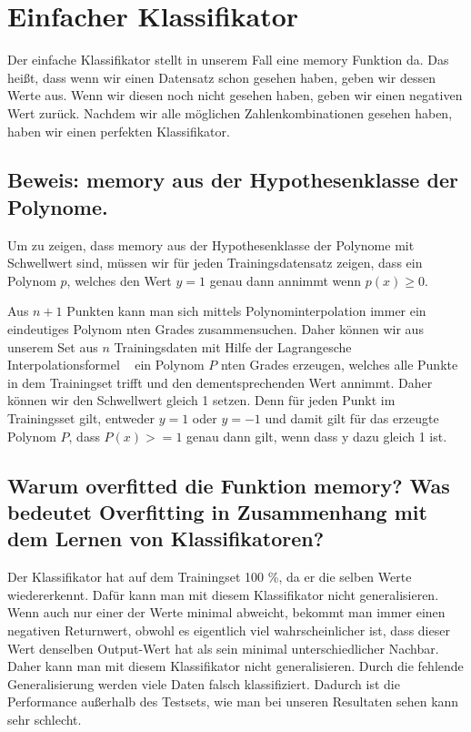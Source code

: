 \section{Einfacher Klassifikator}
\label{ch:implementation}

Der einfache Klassifikator stellt in unserem Fall eine memory Funktion da. Das heißt, dass wenn wir einen Datensatz schon gesehen haben, geben wir dessen Werte aus. Wenn wir diesen noch nicht gesehen haben, geben wir einen negativen Wert zurück. Nachdem wir alle möglichen Zahlenkombinationen gesehen haben, haben wir einen perfekten Klassifikator. 

\subsection{Beweis: memory aus der Hypothesenklasse der Polynome.}

Um zu zeigen, dass memory aus der Hypothesenklasse der Polynome mit Schwellwert sind, müssen wir für jeden Trainingsdatensatz zeigen, dass ein Polynom $p$, welches den Wert $y = 1$ genau dann annimmt wenn $p(x) \ge 0$. 

Aus $n + 1$ Punkten kann man sich mittels Polynominterpolation immer ein eindeutiges Polynom nten Grades zusammensuchen. Daher können wir aus unserem Set aus $n$ Trainingsdaten mit Hilfe der Lagrangesche Interpolationsformel ~\cite{norlund2013vorlesungen} ein Polynom $P$ nten Grades erzeugen, welches alle Punkte in dem Trainingset trifft und den dementsprechenden Wert annimmt. Daher können wir den Schwellwert gleich 1 setzen. Denn für jeden Punkt im Trainingsset gilt, entweder $y = 1$ oder $y = -1$ und damit gilt für das erzeugte Polynom $P$, dass $P(x) >= 1$ genau dann gilt, wenn dass y dazu gleich 1 ist.



\subsection{Warum overfitted die Funktion memory? Was bedeutet Overfitting in Zusammenhang mit dem Lernen von Klassifikatoren?} 

Der Klassifikator hat auf dem Trainingset 100 \%, da er die selben Werte wiedererkennt. Dafür kann man mit diesem Klassifikator nicht generalisieren. Wenn auch nur einer der Werte minimal abweicht, bekommt man immer einen negativen Returnwert, obwohl es eigentlich viel wahrscheinlicher ist, dass dieser Wert denselben Output-Wert hat als sein minimal unterschiedlicher Nachbar. Daher kann man mit diesem Klassifikator nicht generalisieren. Durch die fehlende Generalisierung werden viele Daten falsch klassifiziert. Dadurch ist die Performance außerhalb des Testsets, wie man bei unseren Resultaten sehen kann sehr schlecht. 


